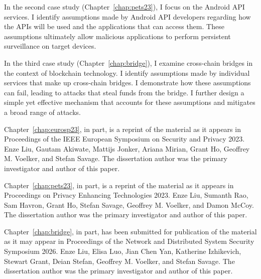 \begin{dissertationintroduction}
In the second case study (Chapter~\ref{chap:pets23}), I focus on the Android API services. I identify assumptions made by Android API developers regarding how the APIs will be used and the applications that can access them. These assumptions ultimately allow malicious applications to perform persistent surveillance on target devices.

In the third case study (Chapter~\ref{chap:bridge}), I examine cross-chain bridges in the context of blockchain technology. I identify assumptions made by individual services that make up cross-chain bridges.
I demonstrate how these assumptions can fail, leading to attacks that steal funds from the bridge. I further design a simple yet effective mechanism that accounts for these assumptions and mitigates a broad range of attacks.


Chapter~\ref{chap:eurosp23}, in part, is a reprint of the material as it appears in Proceedings of the IEEE European Symposium on Security and Privacy 2023. Enze Liu, Gautam Akiwate, Mattijs Jonker, Ariana Mirian, Grant Ho, Geoffrey M. Voelker, and Stefan Savage. The dissertation author was the primary investigator and author of this paper.

Chapter~\ref{chap:pets23}, in part, is a reprint of the material as it appears in Proceedings on Privacy Enhancing Technologies 2023. Enze Liu, Sumanth Rao, Sam Havron, Grant Ho, Stefan Savage, Geoffrey M. Voelker, and
Damon McCoy. The dissertation author was the primary investigator and author of this paper.

Chapter~\ref{chap:bridge}, in part, has been submitted for publication of the material as it may appear in Proceedings of the Network and Distributed System Security Symposium 2026. Enze Liu, Elisa Luo, Jian Chen Yan, Katherine Izhikevich, Stewart Grant, Deian Stefan, Geoffrey M. Voelker, and Stefan Savage. The dissertation author was the primary investigator and author of this paper.



% 






\end{dissertationintroduction}
